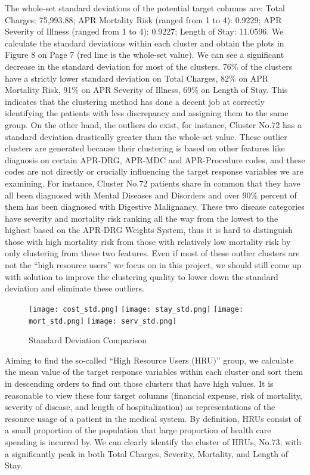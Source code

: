 \documentclass{article}
\begin{document}
\newline
\newline
The whole-set standard deviations of the potential target columns are: Total Charges: 75,993.88; APR Mortality Risk (ranged from 1 to 4): 0.9229;
APR Severity of Illness (ranged from 1 to 4): 0.9227; Length of Stay: 11.0596. We calculate the standard deviations within each cluster and obtain the plots in Figure 8 on Page 7 (red line is the whole-set value). We can see a significant decrease in the standard deviation for most of the clusters. 76\% of the clusters have a strictly lower standard deviation on Total Charges, 82\% on APR Mortality Risk, 91\% on APR Severity of Illness, 69\% on Length of Stay. This indicates that the clustering method has done a decent job at correctly identifying the patients with less discrepancy and assigning them to the same group. On the other hand, the outliers do exist, for instance, Cluster No.72 has a standard deviation drastically greater than the whole-set value. These outlier clusters are generated because their clustering is based on other features like diagnosis on certain APR-DRG, APR-MDC and APR-Procedure codes, and these codes are not directly or crucially influencing the target response variables we are examining. For instance, Cluster No.72 patients share in common that they have all been diagnosed with Mental Diseases and Disorders and over 90\% percent of them has been diagnosed with Digestive Malignancy. These two disease categories have severity and mortality risk ranking all the way from the lowest to the highest based on the APR-DRG Weights System, thus it is hard to distinguish those with high mortality risk from those with relatively low mortality risk by only clustering from these two features. Even if most of these outlier clusters are not the “high resource users” we focus on in this project, we should still come up with solution to improve the clustering quality to lower down the standard deviation and eliminate these outliers.
\newline
\begin{figure}[h]
         \centering
         \texttt{[image: cost\_std.png]}
         \texttt{[image: stay\_std.png]}
         \texttt{[image: mort\_std.png]}
         \texttt{[image: serv\_std.png]}
         \caption{Standard Deviation Comparison}
\end{figure}
\newline
Aiming to find the so-called “High Resource Users (HRU)” group, we calculate the mean value of the target response variables within each cluster and sort them in descending orders to find out those clusters that have high values. It is reasonable to view these four target columns (financial expense, risk of mortality, severity of disease, and length of hospitalization) as representations of the resource usage of a patient in the medical system. By definition, HRUs consist of a small proportion of the population that large proportion of health care spending is incurred by. We can clearly identify the cluster of HRUs, No.73, with a significantly peak in both Total Charges, Severity, Mortality, and Length of Stay. 
\end{document}
